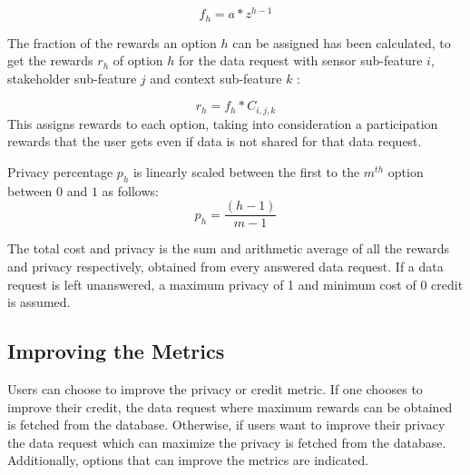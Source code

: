 \begin{equation}
f_{h} = a * z^{h-1}
\end{equation}

The fraction of the rewards an option $h$ can be assigned has been calculated, to get the rewards $r_{h}$ of option $h$ for the data request with sensor sub-feature $i$, stakeholder sub-feature $j$ and
context sub-feature $k$ :

\begin{equation}
r_{h} = f_{h} * C_{i,j,k}
\end{equation}
This assigns rewards to each option, taking into consideration a participation rewards that the user gets even if data is not shared for that data request.

Privacy percentage $p_{h}$ is linearly scaled between the first to the $m^{th}$ option between $0$ and $1$ as follows:
\begin{equation}
p_{h} = \frac{(h-1)}{m-1}
\end{equation}

The total cost and privacy is the sum and arithmetic average of all the rewards and privacy respectively, obtained from every answered data request. If a data request is left unanswered, a maximum privacy of 1 and minimum cost of 0 credit is assumed.


\subsection{Improving the Metrics}
Users can choose to improve the privacy or credit metric. If one chooses to improve their credit, the data request where maximum rewards can be obtained is fetched from the database. Otherwise, if users want to improve their privacy the data request which can maximize the privacy is fetched from the database. Additionally, options that can improve the metrics are indicated.

